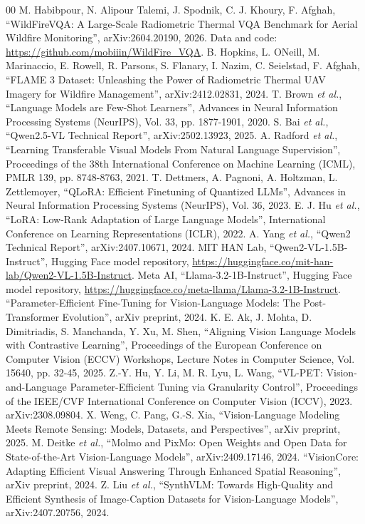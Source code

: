 \documentclass[conference]{IEEEtran}
\begin{document}
\begin{thebibliography}{00}
M. Habibpour, N. Alipour Talemi, J. Spodnik, C. J. Khoury, F. Afghah, ``WildFireVQA: A
Large-Scale Radiometric Thermal VQA Benchmark for Aerial Wildfire Monitoring'',
arXiv:2604.20190, 2026. Data and code: \url{https://github.com/mobiiin/WildFire_VQA}.
B. Hopkins, L. ONeill, M. Marinaccio, E. Rowell, R. Parsons, S. Flanary, I. Nazim,
C. Seielstad, F. Afghah, ``FLAME 3 Dataset: Unleashing the Power of Radiometric Thermal
UAV Imagery for Wildfire Management'', arXiv:2412.02831, 2024.
T. Brown \textit{et al.}, ``Language Models are Few-Shot Learners'', Advances in
Neural Information Processing Systems (NeurIPS), Vol. 33, pp. 1877-1901, 2020.
S. Bai \textit{et al.}, ``Qwen2.5-VL Technical Report'', arXiv:2502.13923, 2025.
A. Radford \textit{et al.}, ``Learning Transferable Visual Models From Natural
Language Supervision'', Proceedings of the 38th International Conference on Machine
Learning (ICML), PMLR 139, pp. 8748-8763, 2021.
T. Dettmers, A. Pagnoni, A. Holtzman, L. Zettlemoyer, ``QLoRA: Efficient
Finetuning of Quantized LLMs'', Advances in Neural Information Processing
Systems (NeurIPS), Vol. 36, 2023.
E. J. Hu \textit{et al.}, ``LoRA: Low-Rank Adaptation of Large Language Models'',
International Conference on Learning Representations (ICLR), 2022.
A. Yang \textit{et al.}, ``Qwen2 Technical Report'', arXiv:2407.10671, 2024.
MIT HAN Lab, ``Qwen2-VL-1.5B-Instruct'', Hugging Face model repository, \url{https://huggingface.co/mit-han-lab/Qwen2-VL-1.5B-Instruct}.
Meta AI, ``Llama-3.2-1B-Instruct'', Hugging Face model repository, \url{https://huggingface.co/meta-llama/Llama-3.2-1B-Instruct}.
``Parameter-Efficient Fine-Tuning for Vision-Language Models: The Post-Transformer Evolution'',
arXiv preprint, 2024.
K. E. Ak, J. Mohta, D. Dimitriadis, S. Manchanda, Y. Xu, M. Shen,
``Aligning Vision Language Models with Contrastive Learning'',
Proceedings of the European Conference on Computer Vision (ECCV) Workshops,
Lecture Notes in Computer Science, Vol. 15640, pp. 32-45, 2025.
Z.-Y. Hu, Y. Li, M. R. Lyu, L. Wang, ``VL-PET: Vision-and-Language Parameter-Efficient
Tuning via Granularity Control'', Proceedings of the IEEE/CVF International Conference on
Computer Vision (ICCV), 2023. arXiv:2308.09804.
X. Weng, C. Pang, G.-S. Xia, ``Vision-Language Modeling Meets Remote Sensing: Models,
Datasets, and Perspectives'', arXiv preprint, 2025.
M. Deitke \textit{et al.}, ``Molmo and PixMo: Open Weights and Open Data for
State-of-the-Art Vision-Language Models'', arXiv:2409.17146, 2024.
``VisionCore: Adapting Efficient Visual Answering Through Enhanced Spatial Reasoning'',
arXiv preprint, 2024.
Z. Liu \textit{et al.}, ``SynthVLM: Towards High-Quality and Efficient Synthesis of
Image-Caption Datasets for Vision-Language Models'', arXiv:2407.20756, 2024.
\end{thebibliography}
\end{document}
